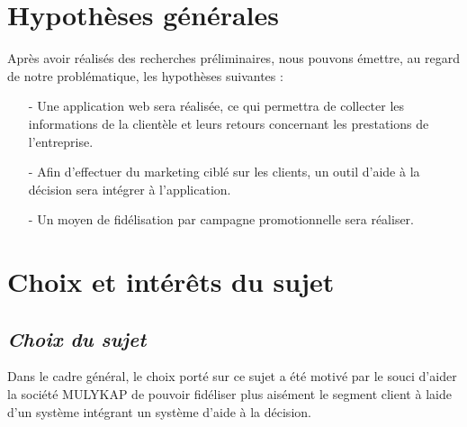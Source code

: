 \documentclass[a4paper,12pt,oneside]{book}
\begin{document}
        \section[Hypothèses générales]{Hypothèses générales}
        Après avoir réalisés des recherches préliminaires, nous pouvons émettre, au regard
        de notre problématique, les hypothèses suivantes : 
        \newline
        \begin{itemize}
            \item [-] Une application web sera réalisée, ce qui permettra de collecter
            les informations de la clientèle et leurs retours concernant les prestations de l’entreprise.
            \newline
            \item [-] Afin d’effectuer du marketing ciblé sur les clients, un outil d'aide à
            la décision sera intégrer à l’application.
            \newline
            \item [-] Un moyen de fidélisation par campagne promotionnelle sera réaliser.
            
        \end{itemize}
        \section[Choix et interet du sujet]{Choix et intérêts du sujet}
            \subsection[Choix du sujet]{\textit{Choix du sujet}}
            Dans le cadre général, le choix porté sur ce sujet a été motivé par le souci d’aider
            la société MULYKAP de pouvoir fidéliser plus aisément le segment client à laide d’un
            système intégrant un système d’aide à la décision.
\end{document}
